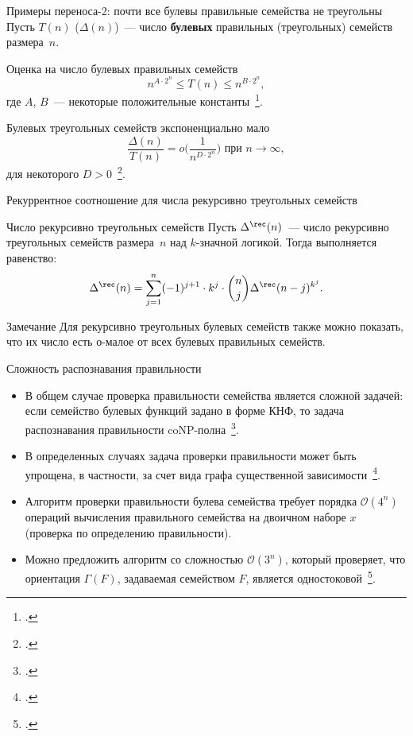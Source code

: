 \begin{frame}{Примеры переноса-2: почти все булевы правильные семейства не треугольны}
    Пусть $T(n)$ ($\Delta(n)$)~--- число \textbf{булевых} правильных (треугольных) семейств размера~$n$.
    \pause
    \begin{alertblock}{Оценка на число булевых правильных семейств}
        \[
            n^{A \cdot 2^n} \le T(n) \le n^{B \cdot 2^n},
        \]
        где $A$, $B$~--- некоторые положительные константы~\footcite{numberUSO}.
    \end{alertblock}
    \pause 
    \begin{alertblock}{Булевых треугольных семейств экспоненциально мало}
    \label{ThTri}
        \[
            \frac{\Delta(n)}{T(n)} = o \Big(\frac{1}{n^{D \cdot 2^n}} \Big) \text{ при } n \to \infty,
        \]
        для некоторого $D > 0$~\footcite{dm21}.
    \end{alertblock}
\end{frame}


\begin{frame}{Рекуррентное соотношение для числа рекурсивно треугольных семейств}
    \begin{alertblock}{Число рекурсивно треугольных семейств}
        Пусть $\Delta^{\rec}(n)$~--- число рекурсивно треугольных семейств размера~$n$ над $k$-значной логикой.
        Тогда выполняется равенство:
        \[
            \Delta^{\rec}(n) = \sum_{j=1}^{n} (-1)^{j+1} \cdot k^j \cdot {n \choose j} \Delta^{\rec}(n-j)^{k^j}.
        \]
    \end{alertblock}
    \pause 
    \begin{exampleblock}{Замечание}
        Для рекурсивно треугольных булевых семейств также можно показать, что их число есть о-малое от всех булевых правильных семейств.
    \end{exampleblock}
\end{frame}


\begin{frame}{Сложность распознавания правильности}
    \begin{itemize}
        \item В общем случае проверка правильности семейства является сложной задачей: если семейство булевых функций задано в форме КНФ, то задача распознавания правильности coNP-полна~\footcite{nosov98}.
        \pause 
        \item В определенных случаях задача проверки правильности может быть упрощена, в частности, за счет вида графа существенной зависимости~\footcite{rykov10, rykov14}.
        \pause 
        \item Алгоритм проверки правильности булева семейства требует порядка $\mathcal{O}(4^n)$ операций вычисления правильного семейства на двоичном наборе $x$ (проверка по определению правильности).
        \pause 
        \item Можно предложить алгоритм со сложностью $\mathcal{O}(3^n)$, который проверяет, что ориентация $\Gamma(F)$, задаваемая семейством $F$, является одностоковой~\footcite{bosshard2017pseudo}.
    \end{itemize}
\end{frame}


